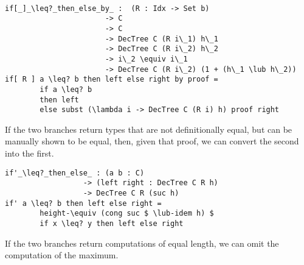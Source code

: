 \begin{lstlisting}[caption={Alternatives to if-then-else},label={lst:dectree:ifthenelse-alt},emph={if,then,else,by,DecTree,\_then\_else\_by\_,\[\_\]\_}]

if[_]_\leq?_then_else_by_ :  (R : Idx -> Set b)
                       -> C
                       -> C
                       -> DecTree C (R i\_1) h\_1
                       -> DecTree C (R i\_2) h\_2
                       -> i\_2 \equiv i\_1
                       -> DecTree C (R i\_2) (1 + (h\_1 \lub h\_2))
if[ R ] a \leq? b then left else right by proof =
        if a \leq? b
        then left
        else subst (\lambda i -> DecTree C (R i) h) proof right
\end{lstlisting}

If the two branches return types that are not definitionally equal, but can be manually shown to be equal, then, given that proof, we can convert the second into the first.

\begin{lstlisting}[caption={Alternatives to if-then-else},label={lst:dectree:ifthenelse-alt:2},emph={if'\_,\_then\_else\_,if,then,else,DecTree}]
if'_\leq?_then_else_ : (a b : C)
                  -> (left right : DecTree C R h)
                  -> DecTree C R (suc h)
if' a \leq? b then left else right =
        height-\equiv (cong suc $ \lub-idem h) $
        if x \leq? y then left else right
\end{lstlisting}

If the two branches return computations of equal length, we can omit the computation of the maximum.
